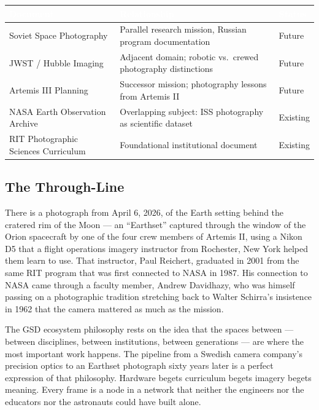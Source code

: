 \documentclass[11pt,letterpaper]{article}
\newcommand{\tableheader}[1]{\textbf{\sffamily\textcolor{white}{#1}}}
\begin{document}
\begin{center}
\begin{tabularx}{\textwidth}{L{4cm}XC{2.5cm}}
\toprule
{}
\tableheader{Document} & \tableheader{Relationship} & \tableheader{Status} \\
\midrule
Soviet Space Photography & Parallel research mission, Russian program documentation & Future \\
JWST / Hubble Imaging & Adjacent domain; robotic vs.\ crewed photography distinctions & Future \\
Artemis III Planning & Successor mission; photography lessons from Artemis II & Future \\
NASA Earth Observation Archive & Overlapping subject: ISS photography as scientific dataset & Existing \\
RIT Photographic Sciences Curriculum & Foundational institutional document & Existing \\
\bottomrule
\end{tabularx}
\end{center}

\subsection{The Through-Line}

There is a photograph from April 6, 2026, of the Earth setting behind the cratered rim of the Moon --- an ``Earthset'' captured through the window of the Orion spacecraft by one of the four crew members of Artemis II, using a Nikon D5 that a flight operations imagery instructor from Rochester, New York helped them learn to use. That instructor, Paul Reichert, graduated in 2001 from the same RIT program that was first connected to NASA in 1987. His connection to NASA came through a faculty member, Andrew Davidhazy, who was himself passing on a photographic tradition stretching back to Walter Schirra's insistence in 1962 that the camera mattered as much as the mission.

The GSD ecosystem philosophy rests on the idea that the spaces between --- between disciplines, between institutions, between generations --- are where the most important work happens. The pipeline from a Swedish camera company's precision optics to an Earthset photograph sixty years later is a perfect expression of that philosophy. Hardware begets curriculum begets imagery begets meaning. Every frame is a node in a network that neither the engineers nor the educators nor the astronauts could have built alone.
\end{document}
